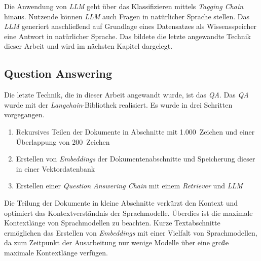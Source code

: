 

Die Anwendung von \textit{LLM} geht über das Klassifizieren mittels \textit{Tagging Chain} hinaus. Nutzende können \textit{LLM} auch Fragen in natürlicher Sprache stellen. Das \textit{LLM} generiert anschließend auf Grundlage eines Datensatzes als Wissensspeicher eine Antwort in natürlicher Sprache. Das bildete die letzte angewandte Technik dieser Arbeit und wird im nächsten Kapitel dargelegt.


\subsection{Question Answering}

Die letzte Technik, die in dieser Arbeit angewandt wurde, ist das \textit{QA}. Das \textit{QA} wurde mit der \textit{Langchain}-Bibliothek realisiert. Es wurde in drei Schritten vorgegangen. 
\begin{enumerate}
    \item Rekursives Teilen der Dokumente in Abschnitte mit 1.000~Zeichen und einer Überlappung von 200~Zeichen
    \item Erstellen von \textit{Embeddings} der Dokumentenabschnitte und Speicherung dieser in einer Vektordatenbank 
    \item Erstellen einer \textit{Question Answering Chain} mit einem \textit{Retriever} und \textit{LLM}
\end{enumerate}

Die Teilung der Dokumente in kleine Abschnitte verkürzt den Kontext und optimiert das Kontextverständnis der Sprachmodelle. Überdies ist die maximale Kontextlänge von Sprachmodellen zu beachten. Kurze Textabschnitte ermöglichen das Erstellen von \textit{Embeddings} mit einer Vielfalt von Sprachmodellen, da zum Zeitpunkt der Ausarbeitung nur wenige Modelle über eine große maximale Kontextlänge verfügen.

